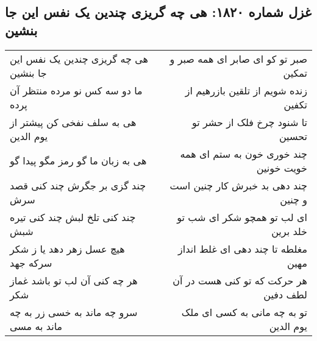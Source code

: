 \begin{center}
\section*{غزل شماره ۱۸۲۰: هی چه گریزی چندین یک نفس این جا بنشین}
\label{sec:1820}
\begin{longtable}{l p{0.5cm} r}
هی چه گریزی چندین یک نفس این جا بنشین
&&
صبر تو کو ای صابر ای همه صبر و تمکین
\\
ما دو سه کس نو مرده منتظر آن پرده
&&
زنده شویم از تلقین بازرهیم از تکفین
\\
هی به سلف نفخی کن پیشتر از یوم الدین
&&
تا شنود چرخ فلک از حشر تو تحسین
\\
هی به زبان ما گو رمز مگو پیدا گو
&&
چند خوری خون به ستم ای همه خویت خونین
\\
چند گزی بر جگرش چند کنی قصد سرش
&&
چند دهی بد خبرش کار چنین است و چنین
\\
چند کنی تلخ لبش چند کنی تیره شبش
&&
ای لب تو همچو شکر ای شب تو خلد برین
\\
هیچ عسل زهر دهد یا ز شکر سرکه جهد
&&
مغلطه تا چند دهی ای غلط انداز مهین
\\
هر چه کنی آن لب تو باشد غماز شکر
&&
هر حرکت که تو کنی هست در آن لطف دفین
\\
سرو چه ماند به خسی زر به چه ماند به مسی
&&
تو به چه مانی به کسی ای ملک یوم الدین
\\
\end{longtable}
\end{center}

